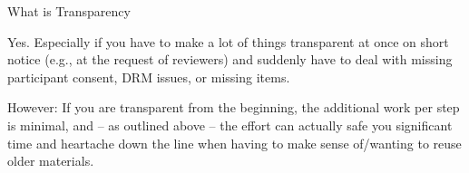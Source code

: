 \begin{block}{What is Transparency}
  
  Yes. Especially if you have to make a lot of things transparent at once on short notice (e.g., at the request of reviewers) and suddenly have to deal with missing participant consent, DRM issues, or missing items.
  
  However: If you are transparent from the beginning, the additional work per step is minimal, and -- as outlined above -- the effort can actually safe you significant time and heartache down the line when having to make sense of/wanting to reuse older materials.

\end{block}

